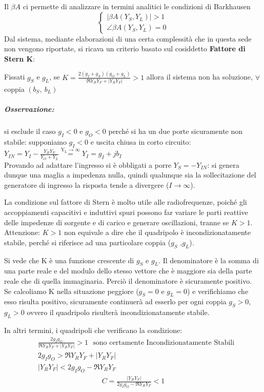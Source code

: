 Il $\beta A$ ci permette di analizzare in termini analitici le condizioni di Barkhausen
$$\begin{cases}
| \beta A (Y_S,Y_L) | > 1\\
\angle \beta A (Y_S,Y_L)  = 0
\end{cases}$$
Dal sistema, mediante elaborazioni di una certa complessità che in questa sede non vengono
riportate, si ricava un criterio basato sul cosiddetto \textbf{Fattore di Stern K}:

Fissati $g_S$ e $g_L$, se
$\displaystyle K = \frac{2(g_I+g_S)(g_O + g_L)}{\Re{Y_R Y_F}	+  |Y_R Y_F|} > 1$ allora il sistema non ha soluzione, $\forall$ coppia $(b_S,~b_L)$

\subparagraph{Osservazione:} si esclude il caso $g_I<0$ e $g_O<0$ perché si ha un due porte sicuramente non stabile:
supponiamo $g_I < 0$ e uscita chiusa in corto circuito: $Y_{IN} = Y_I - \frac{Y_R Y_F}{Y_O + Y_L} \overset{\mathrm{Y_L \rightarrow \infty}}{=} Y_I
= g_I + jb_I$
\\
Provando ad adattare l'ingresso si è obbligati a porre $Y_S = -Y_{IN}$: si genera dunque una maglia a impedenza nulla, quindi qualunque sia la sollecitazione del generatore di ingresso la risposta tende a divergere ($I \rightarrow \infty$).

La condizione sul fattore di Stern è molto utile alle radiofrequenze, poiché gli accoppiamenti capacitivi e induttivi spuri possono far variare le parti reattive delle impedenze di sorgente e di carico e generare oscillazioni, tranne se $K>1$.\\
Attenzione: $K>1$ non equivale a dire che il quadripolo è incondizionatamente stabile, perché si riferisce ad una particolare coppia ($g_S$ ,$g_L$).

Si vede che K è una funzione crescente di $g_S$ e $g_L$. Il denominatore è la somma di una parte reale e del modulo
dello stesso vettore che è maggiore sia della parte reale che di quella immaginaria. Perciò il
denominatore è sicuramente positivo.\\
Se calcoliamo K nella situazione peggiore ($g_S =0$ e $g_L =0$) e verifichiamo che esso risulta positivo, sicuramente continuerà ad esserlo per ogni coppia $g_S >0$, $g_L > 0$	ovvero il quadripolo risulterà incondizionatamente stabile.
	
In altri termini, i quadripoli che verificano la condizione:
\begin{align*}
&
\frac{2 g_I g_O}{\Re{Y_R Y_F} + |Y_R Y_F|} > 1
~~~
\mbox{sono certamente Incondizionatamente Stabili}\\
&
2 g_I g_O > \Re{Y_R Y_F} + |Y_R Y_F|
\\
&
|Y_R Y_F| < 2 g_I g_O - \Re{Y_R Y_F}
\end{align*}
\begin{align}
C = \frac{|Y_R Y_F|}{2 g_I g_O - \Re{Y_R Y_F}} < 1
\end{align}

